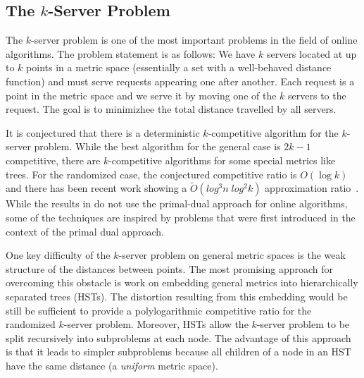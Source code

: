 \subsection{The $k$-Server Problem}
The $k$-server problem is one of the most important problems in the field of online algorithms.
The problem statement is as follows:
We have $k$ servers located at up to $k$ points in a metric space (essentially a set with a well-behaved distance function) and must serve requests appearing one after another.
Each request is a point in the metric space and we serve it by moving one of the $k$ servers to the request.
The goal is to minimizhee the total distance travelled by all servers.

It is conjectured that there is a deterministic $k$-competitive algorithm for the $k$-server problem.
While the best algorithm for the general case is $2k -1$ competitive, there are $k$-competitive algorithms for some special metrics like trees.
For the randomized case, the conjectured competitive ratio is $O(\log k)$ and there has been recent work showing a $\tilde{O}(log^3 n \; log^2 k)$ approximation ratio~\cite{bansal11:randomized-k-server}.
While the results in \cite{bansal11:randomized-k-server} do not use the primal-dual approach for online algorithms, some of the techniques are inspired by problems that were first introduced in the context of the primal dual approach.

One key difficulty of the $k$-server problem on general metric spaces is the weak structure of the distances between points.
The most promising approach for overcoming this obstacle is work on embedding general metrics into hierarchically separated trees (HSTs).
The distortion resulting from this embedding would be still be sufficient to provide a polylogarithmic competitive ratio for the randomized $k$-server problem.
Moreover, HSTs allow the $k$-server problem to be split recursively into subproblems at each node.
The advantage of this approach is that it leads to simpler subproblems because all children of a node in an HST have the same distance (a \emph{uniform} metric space).

